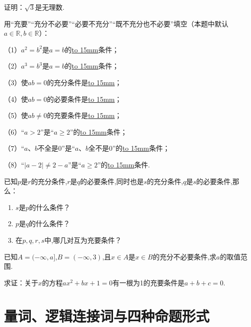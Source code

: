 \documentclass[lang=cn,math=cm,chinesefont=nofont,11pt,scheme=chinese,twocol]{elegantbook}
\begin{document}
\begin{exercise}\label{202407081520}
  证明：$\sqrt{3}$是无理数.
\end{exercise}

\begin{exercise}\label{BJ4Z_Algebra1_P28.2}
  用“充要”“充分不必要”“必要不充分”“既不充分也不必要”填空（本题中默认$a\in\mathbb{R},b\in\mathbb{R}$）：

  （1）$a^2=b^2$是$a=b$的\underline{\hbox to 15mm{}}条件；

  （2）$a^3=b^3$是$a=b$的\underline{\hbox to 15mm{}}条件；

  （3）使$ab=0$的充分条件是\underline{\hbox to 15mm{}}；

  （4）使$ab=0$的必要条件是\underline{\hbox to 15mm{}}；

  （5）使$ab\neq 0$的充要条件是\underline{\hbox to 15mm{}}；

  （6）“$a>2$”是“$a\geqslant2$”的\underline{\hbox to 15mm{}}条件；

  （7）“$a、b$不全是0”是“$a、b$全不是0”的\underline{\hbox to 15mm{}}条件；

  （8）“$\vert a-2\vert\neq2-a$”是“$a\geqslant2$”的\underline{\hbox to 15mm{}}条件.
\end{exercise}

\begin{exercise}\label{2017_XJ_bx1_P23.8}
  已知$p$是$r$的充分条件,$r$是$q$的必要条件,同时也是$s$的充分条件,$q$是$s$的必要条件,那么：
\end{exercise}

\begin{enumerate}
  \item $s$是$p$的什么条件？
  \item $p$是$q$的什么条件？
  \item 在$p,q,r,s$中,哪几对互为充要条件？
\end{enumerate}

\begin{exercise}\label{2017_RJB_bx1_P36.B5}
  已知$A=(-\infty,a]$,$B=(-\infty,3)$,且$x\in A$是$x\in B$的充分不必要条件,求$a$的取值范围.
\end{exercise}

\begin{exercise}\label{zhw2000_g1_P51.78}
  求证：关于$x$的方程$ax^2+bx+1=0$有一根为1的充要条件是$a+b+c=0$.
\end{exercise}

\section{量词、逻辑连接词与四种命题形式}
\end{document}
